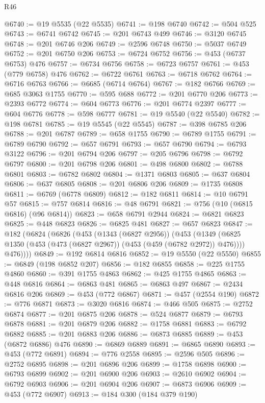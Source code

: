 \begin{lexlean}{R46}
\begin{coremodule}
@6740 := @19 @5535 (@22 @5535)
@6741 := @198 @6740
@6742 := @504 @525
@6743 := @6741 @6742
@6745 := @201 @6743 @499
@6746 := @3120 @6745
@6748 := @201 @6746 @206
@6749 := @2596 @6748
@6750 := @5037 @6749
@6752 := @201 @6750 @206
@6753 := @6724 @6752
@6756 := @453 (@6737 @6753) @476
@6757 := @6734 @6756
@6758 := @6723 @6757
@6761 := @453 (@779 @6758) @476
@6762 := @6722 @6761
@6763 := @6718 @6762
@6764 := @6716 @6763
@6766 := @6685 (@6714 @6764)
@6767 := @182 @6766
@6769 := @685 @3063 @1755
@6770 := @595 @688
@6772 := @201 @6770 @206
@6773 := @2393 @6772
@6774 := @604 @6773
@6776 := @201 @6774 @2397
@6777 := @604 @6776
@6778 := @598 @6777
@6781 := @19 @5540 (@22 @5540)
@6782 := @198 @6781
@6785 := @19 @5545 (@22 @5545)
@6787 := @398 @6785 @206
@6788 := @201 @6787
@6789 := @658 @1755
@6790 := @6789 @1755
@6791 := @6789 @6790
@6792 := @657 @6791
@6793 := @657 @6790
@6794 := @6793 @3122
@6796 := @201 @6794 @206
@6797 := @205 @6796
@6798 := @6792 @6797
@6800 := @201 @6798 @206
@6801 := @498 @6800
@6802 := @6788 @6801
@6803 := @6782 @6802
@6804 := @1371 @6803
@6805 := @637 @6804
@6806 := @637 @6805
@6808 := @201 @6806 @206
@6809 := @1735 @6808
@6811 := @6769 (@6778 @6809)
@6812 := @182 @6811
@6814 := @10 @6791 @57
@6815 := @757 @6814
@6816 := @48 @6791
@6821 := @756 (@10 (@6815 @6816) (@96 @6814))
@6823 := @658 @6791 @2944
@6824 := @6821 @6823
@6825 := @448 @6823
@6826 := @6825 @481
@6827 := @657 @6823
@6847 := @182
    (@6824
      (@6826
        (@453
          (@1343 (@6827 @2956))
          (@453
            (@1349 (@6825 @1350 (@453 (@473 (@6827 @2967)) (@453 (@459 (@6782 @2972)) @476))))
            @476))))
@6849 := @192 @6814 @6816
@6852 := @19 @5550 (@22 @5550)
@6855 := @6849 (@198 @6852 @207)
@6856 := @182 @6855
@6858 := @225 @1755 @4860
@6860 := @391 @1755 @4863
@6862 := @425 @1755 @4865
@6863 := @448 @6816
@6864 := @6863 @481
@6865 := @6863 @497
@6867 := @2434 @6816 @206
@6869 := @453 (@772 @6867)
@6871 := @457 (@2554 @190)
@6872 := @776 @6871
@6873 := @3020 @6816
@6874 := @466 @505
@6875 := @2752 @6874
@6877 := @201 @6875 @206
@6878 := @524 @6877
@6879 := @6793 @6878
@6881 := @201 @6879 @206
@6882 := @1758 @6881
@6883 := @6792 @6882
@6885 := @201 @6883 @206
@6886 := @6873 @6885
@6889 := @453 (@6872 @6886) @476
@6890 := @6869 @6889
@6891 := @6865 @6890
@6893 := @453 (@772 @6891)
@6894 := @776 @2558
@6895 := @2596 @505
@6896 := @2752 @6895
@6898 := @201 @6896 @206
@6899 := @1758 @6898
@6900 := @6793 @6899
@6902 := @201 @6900 @206
@6903 := @2610 @6902
@6904 := @6792 @6903
@6906 := @201 @6904 @206
@6907 := @6873 @6906
@6909 := @453 (@772 @6907)
@6913 := @184 @300 (@184 @379 @190)

\end{coremodule}
\end{lexlean}
